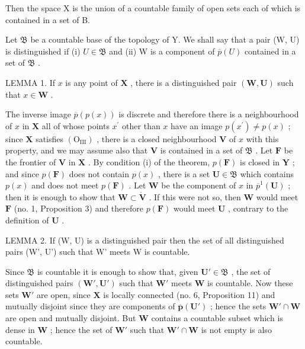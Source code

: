 Then the space X is the union of a countable family of open sets each of which is contained in a set of B.

Let \(\mathfrak{B}\) be a countable base of the topology of Y. We shall say that a pair (W, U) is distinguished if (i) \(U \in \mathfrak{B}\) and (ii) W is a component of \(\overline{p}(U)\) contained in a set of \(\mathfrak{B}\) .

LEMMA 1. If \(x\) is any point of \(\mathbf{X}\) , there is a distinguished pair \((\mathbf{W}, \mathbf{U})\) such that \(x \in \mathbf{W}\) .

The inverse image \(\overline{p} (p(x))\) is discrete and therefore there is a neighbourhood of \(x\) in \(\mathbf{X}\) all of whose points \(x^{\prime}\) other than \(x\) have an image \(p(x^{\prime})\neq p(x)\) ; since \(\mathbf{X}\) satisfies \((\mathrm{O}_{\mathrm{III}})\) , there is a closed neighbourhood \(\mathbf{V}\) of \(x\) with this property, and we may assume also that \(\mathbf{V}\) is contained in a set of \(\mathfrak{B}\) . Let \(\mathbf{F}\) be the frontier of \(\mathbf{V}\) in \(\mathbf{X}\) . By condition (i) of the theorem, \(p(\mathbf{F})\) is closed in \(\mathbf{Y}\) ; and since \(p(\mathbf{F})\) does not contain \(p(x)\) , there is a set \(\mathbf{U}\in \mathfrak{B}\) which contains \(p(x)\) and does not meet \(p(\mathbf{F})\) . Let \(\mathbf{W}\) be the component of \(x\) in \(\overline{p}^{1}(\mathbf{U})\) ; then it is enough to show that \(\mathbf{W}\subset \mathring{\mathbf{V}}\) . If this were not so, then \(\mathbf{W}\) would meet \(\mathbf{F}\) (no. 1, Proposition 3) and therefore \(p(\mathbf{F})\) would meet \(\mathbf{U}\) , contrary to the definition of \(\mathbf{U}\) .

LEMMA 2. If (W, U) is a distinguished pair then the set of all distinguished pairs (W', U') such that W' meets W is countable.

Since \(\mathfrak{B}\) is countable it is enough to show that, given \(\mathbf{U}' \in \mathfrak{B}\) , the set of distinguished pairs \((\mathbf{W}', \mathbf{U}')\) such that \(\mathbf{W}'\) meets \(\mathbf{W}\) is countable. Now these sets \(\mathbf{W}'\) are open, since \(\mathbf{X}\) is locally connected (no. 6, Proposition 11) and mutually disjoint since they are components of \(\overline{\boldsymbol{p}}(\mathbf{U}')\) ; hence the sets \(\mathbf{W}' \cap \mathbf{W}\) are open and mutually disjoint. But \(\mathbf{W}\) contains a countable subset which is dense in \(\mathbf{W}\) ; hence the set of \(\mathbf{W}'\) such that \(\mathbf{W}' \cap \mathbf{W}\) is not empty is also countable.

